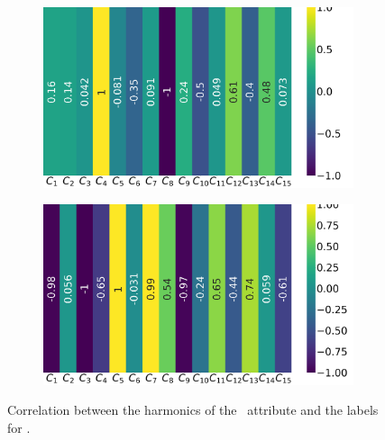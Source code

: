 \begin{figure}[!ht]
\begin{subfigure}{0.49\linewidth}
		\includegraphics[width=\linewidth]{img/qlp_corr/Bn_coil2.png}
	\end{subfigure}
	\begin{subfigure}{0.49\linewidth}
		\includegraphics[width=\linewidth]{img/qlp_corr/Bn_coil3.png}
	\end{subfigure}
	\caption{Correlation between the harmonics of the \bn\ attribute and the labels for \qlp.}
	\label{fig:bn-lcorr-qlp}
\end{figure}

